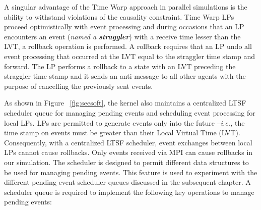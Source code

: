 A singular advantage of the Time Warp approach in parallel simulations is the ability to withstand violations of the causality constraint. Time Warp LPs proceed optimistically with event processing and during occasions that an LP encounters an event (\textit{named a \textbf{straggler}}) with a receive time lesser than the LVT, a rollback operation is performed. A rollback requires that an LP undo all event processing that occurred at the LVT equal to the straggler time stamp and forward. The LP performs a rollback to a state with an LVT preceding the straggler time stamp and it sends an anti-message to all other agents with the purpose of cancelling the previously sent events.

As shown in Figure ~\ref{fig:seesoft}, the kernel also maintains a centralized LTSF scheduler queue for managing pending events and scheduling event processing for local LPs. LPs are permitted to generate events only into the future --\textit{i.e.,} the time stamp on events must be greater than their Local Virtual Time (LVT). Consequently, with a centralized LTSF scheduler, event exchanges between local LPs cannot cause rollbacks. Only events received via MPI can cause rollbacks in our simulation. The scheduler is designed to permit different data structures to be used for managing pending events. This feature is used to experiment with the different pending event scheduler queues discussed in the subsequent chapter. A scheduler queue is required to implement the following key operations to manage pending events:

